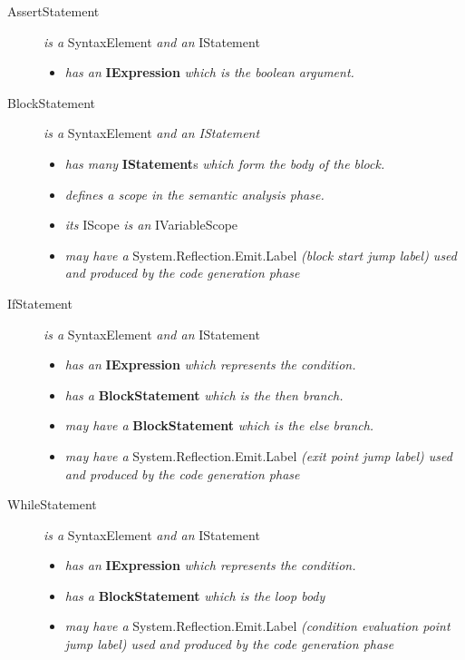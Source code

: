 \documentclass[a4paper,11pt]{article}
\begin{document}
\begin{description}
    \item[AssertStatement] \emph{is a} SyntaxElement \emph{and an} IStatement
      \begin{itemize}
        \item \emph{has an} \textbf{IExpression} \emph{which is the boolean argument.}
      \end{itemize}
    \item[BlockStatement] \emph{is a} SyntaxElement \emph{and an IStatement}
      \begin{itemize}
        \item \emph{has many} \textbf{IStatement}s \emph{which form the body of the block.}
        \item \emph{defines a scope in the semantic analysis phase.}
        \item \emph{its} IScope \emph{is an} IVariableScope
        \item \emph{may have a} System.Reflection.Emit.Label \emph{(block start jump label) used and produced by the code generation phase}
      \end{itemize}
    \item[IfStatement] \emph{is a} SyntaxElement \emph{and an} IStatement
      \begin{itemize}
        \item \emph{has an} \textbf{IExpression} \emph{which represents the condition.}
        \item \emph{has a} \textbf{BlockStatement} \emph{which is the then branch.}
        \item \emph{may have a} \textbf{BlockStatement} \emph{which is the else branch.}
        \item \emph{may have a} System.Reflection.Emit.Label \emph{(exit point jump label) used and produced by the code generation phase}
      \end{itemize}
    \item[WhileStatement] \emph{is a} SyntaxElement \emph{and an} IStatement
      \begin{itemize}
        \item \emph{has an} \textbf{IExpression} \emph{which represents the condition.}
        \item \emph{has a} \textbf{BlockStatement} \emph{which is the loop body}
        \item \emph{may have a} System.Reflection.Emit.Label \emph{(condition evaluation point jump label) used and produced by the code generation phase}
      \end{itemize}

\end{description}
\end{document}
